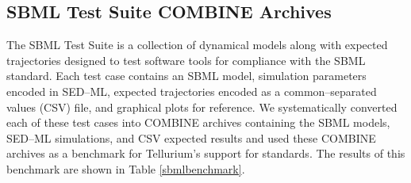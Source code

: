 \documentclass[10pt,letterpaper]{article}
\begin{document}
\subsection*{SBML Test Suite COMBINE Archives}

The SBML Test Suite \cite{sbmltestsuite} is a collection of dynamical models along with expected trajectories designed to test software tools for compliance with the SBML standard. Each test case contains an SBML model, simulation parameters encoded in SED--ML, expected trajectories encoded as a common--separated values (CSV) file, and graphical plots for reference. We systematically converted each of these test cases into COMBINE archives containing the SBML models, SED--ML simulations, and CSV expected results and used these COMBINE archives as a benchmark for Tellurium's support for standards. The results of this benchmark are shown in Table \ref{sbmlbenchmark}.







\end{document}
